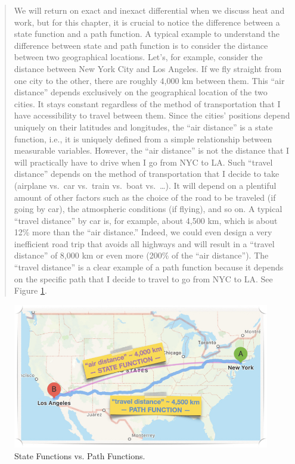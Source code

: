 \documentclass[
]{book}
\theoremstyle{definition}
\theoremstyle{definition}
\theoremstyle{definition}
\theoremstyle{remark}
\begin{document}
\begin{quote}
We will return on exact and inexact differential when we discuss heat and work, but for this chapter, it is crucial to notice the difference between a state function and a path function. A typical example to understand the difference between state and path function is to consider the distance between two geographical locations. Let's, for example, consider the distance between New York City and Los Angeles. If we fly straight from one city to the other, there are roughly 4,000 km between them. This ``air distance'' depends exclusively on the geographical location of the two cities. It stays constant regardless of the method of transportation that I have accessibility to travel between them. Since the cities' positions depend uniquely on their latitudes and longitudes, the ``air distance'' is a state function, i.e., it is uniquely defined from a simple relationship between measurable variables. However, the ``air distance'' is not the distance that I will practically have to drive when I go from NYC to LA. Such ``travel distance'' depends on the method of transportation that I decide to take (airplane vs.~car vs.~train vs.~boat vs.~\ldots). It will depend on a plentiful amount of other factors such as the choice of the road to be traveled (if going by car), the atmospheric conditions (if flying), and so on. A typical ``travel distance'' by car is, for example, about 4,500 km, which is about 12\% more than the ``air distance.'' Indeed, we could even design a very inefficient road trip that avoids all highways and will result in a ``travel distance'' of 8,000 km or even more (200\% of the ``air distance''). The ``travel distance'' is a clear example of a path function because it depends on the specific path that I decide to travel to go from NYC to LA. See Figure \ref{fig:Fig2c1}.
\end{quote}

\begin{figure}

{\centering \includegraphics[width=0.8\linewidth]{./img/OEP_Figures.002} 

}

\caption{State Functions vs. Path Functions.}\label{fig:Fig2c1}
\end{figure}
\end{document}

